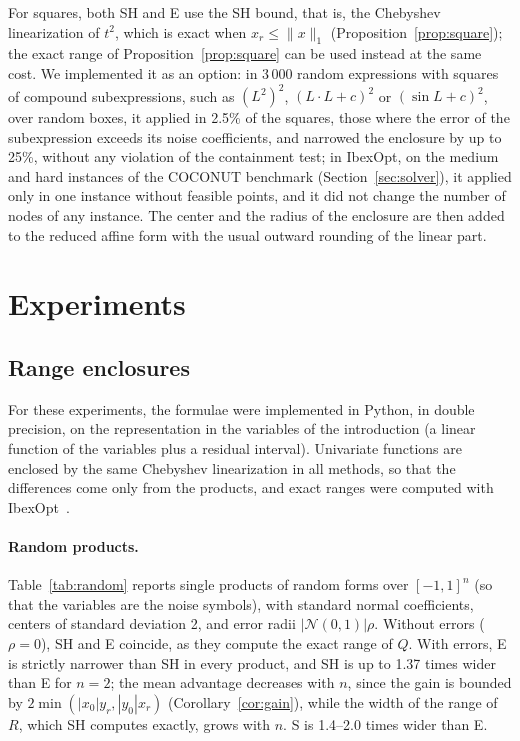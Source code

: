 \documentclass[10pt]{article}
\theoremstyle{definition}
\begin{document}
For squares, both SH and E use the SH bound, that is, the Chebyshev linearization of $t^2$, which is exact when $x_r\le\|x\|_1$ (Proposition~\ref{prop:square}); the exact range of Proposition~\ref{prop:square} can be used instead at the same cost. We implemented it as an option: in 3\,000 random expressions with squares of compound subexpressions, such as $(L^2)^2$, $(L\cdot L+c)^2$ or $(\sin L+c)^2$, over random boxes, it applied in 2.5\% of the squares, those where the error of the subexpression exceeds its noise coefficients, and narrowed the enclosure by up to 25\%, without any violation of the containment test; in IbexOpt, on the medium and hard instances of the COCONUT benchmark (Section~\ref{sec:solver}), it applied only in one instance without feasible points, and it did not change the number of nodes of any instance. The center and the radius of the enclosure are then added to the reduced affine form with the usual outward rounding of the linear part.

\section{Experiments}
\label{sec:experiments}

\subsection{Range enclosures}

For these experiments, the formulae were implemented in Python, in double precision, on the representation in the variables of the introduction (a linear function of the variables plus a residual interval). Univariate functions are enclosed by the same Chebyshev linearization in all methods, so that the differences come only from the products, and exact ranges were computed with IbexOpt~\cite{chabert2009}.

\paragraph{Random products.} Table~\ref{tab:random} reports single products of random forms over $[-1,1]^n$ (so that the variables are the noise symbols), with standard normal coefficients, centers of standard deviation 2, and error radii $|\mathcal N(0,1)|\rho$. Without errors ($\rho=0$), SH and E coincide, as they compute the exact range of $Q$. With errors, E is strictly narrower than SH in every product, and SH is up to 1.37 times wider than E for $n=2$; the mean advantage decreases with $n$, since the gain is bounded by $2\min(|x_0|y_r,|y_0|x_r)$ (Corollary~\ref{cor:gain}), while the width of the range of $R$, which SH computes exactly, grows with $n$. S is 1.4--2.0 times wider than E.
\end{document}
